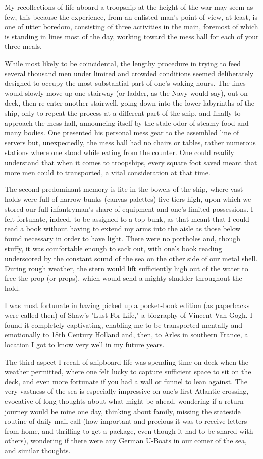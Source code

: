 \documentclass[../m3y]{subfiles}
\begin{document}
My recollections of life aboard a troopship at the height of the war may seem as few, this because the experience, from an enlisted man's point of view, at least, is one of utter boredom, consisting of three activities in the main, foremost of which is standing in lines most of the day, working toward the mess hall for each of your three meals.

While most likely to be coincidental, the lengthy procedure in trying to feed several thousand men under limited and crowded conditions seemed deliberately designed to occupy the most substantial part of one's waking hours. The lines would slowly move up one stairway (or ladder, as the Navy would say), out on deck, then re-enter another stairwell, going down into the lower labyrinths of the ship, only to repeat the process at a different part of the ship, and finally to approach the mess hall, announcing itself by the stale odor of steamy food and many bodies. One presented his personal mess gear to the assembled line of servers but, unexpectedly, the mess hall had no chairs or tables, rather numerous stations where one stood while eating from the counter. One could readily understand that when it comes to troopships, every square foot saved meant that more men could to transported, a vital consideration at that time.

The second predominant memory is lite in the bowels of the ship, where vast holds were full of narrow bunks (canvas palettes) five tiers high, upon which we stored our full infantryman's share of equipment and one's limited possessions. I felt fortunate, indeed, to be assigned to a top bunk, as that meant that I could read a book without having to extend my arms into the aisle as those below found necessary in order to have light. There were no portholes and, though stuffy, it was comfortable enough to sack out, with one's book reading underscored by the constant sound of the sea on the other side of our metal shell. During rough weather, the stern would lift sufficiently high out of the water to free the prop (or props), which would send a mighty shudder throughout the hold.

I was most fortunate in having picked up a pocket-book edition (as paperbacks were called then) of Shaw's "Lust For Life," a biography of Vincent Van Gogh. I found it completely captivating, enabling me to be transported mentally and emotionally to 18th Century Holland and, then, to Arles in southern France, a location I got to know very well in my future years.

The third aspect I recall of shipboard life was spending time on deck when the weather permitted, where one felt lucky to capture sufficient space to sit on the deck, and even more fortunate if you had a wall or funnel to lean against. The very vastness of the sea is especially impressive on one's first Atlantic crossing, evocative of long thoughts about what might be ahead, wondering if a return journey would be mine one day, thinking about family, missing the stateside routine of daily mail call (how important and precious it was to receive letters from home, and thrilling to get a package, even though it had to be shared with others), wondering if there were any German U-Boats in our comer of the sea, and similar thoughts.
\end{document}
